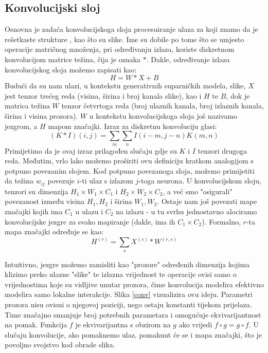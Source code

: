 \subsection{Konvolucijski sloj} 
Osnovna je zadaća konvolucijskoga sloja procesuiranje ulaza za koji znamo da je rešetkaste strukture \citep{Goodfellow-et-al-2016}, kao što su slike. Ime su dobile po tome što se umjesto operacije matričnog množenja, pri određivanju izlaza, koriste diskretnom konvolucijom matrice težina, čija je oznaka $*$. Dakle, određivanje izlaza konvolucijskog sloja možemo zapisati kao:
\begin{equation}
H = W * X + B
\end{equation}
Budući da su nam ulazi, u kontekstu generativnih suparničkih modela, slike, $X$ jest tenzor trećeg reda (visina, širina i broj kanala slike), kao i $H$ te $B$, dok je matrica težina $W$ tenzor četvrtoga reda (broj ulaznih kanala, broj izlaznih kanala, širina i visina prozora). $W$ u kontekstu konvolucijskoga sloja još nazivamo jezgrom, a $H$ mapom značajki. 
Izraz za diskretnu konvoluciju glasi:
\begin{equation}
(K * I)(i, j) = \sum_m\sum_nI(i - m, j - n)K(m, n)
\end{equation}
Primijetimo da je ovaj izraz prilagođen slučaju gdje su $K$ i $I$ tenzori drugoga reda. Međutim, vrlo lako možemo proširiti ovu definiciju kratkom analogijom s potpuno povezanim slojem. Kod potpuno povezanoga sloja, možemo primijetiti da težina $w_{ij}$ povezuje $i$-ti ulaz s izlazom $j$-toga neurona. U konvolucijskom sloju, tenzori su dimenzija $H_1 \times W_1 \times C_1$ i $H_2 \times W_2 \times C_2$, a već smo "osigurali" povezanost između visina $H_1, H_2$ i širina $W_1, W_2$. Ostaje nam još povezati mape značajki kojih ima $C_1$ u ulazu i $C_2$ na izlazu - u tu svrhu jednostavno alociramo konvolucijske jezgre za svako mapiranje (dakle, ima ih $C_1 \times C_2$). Formalno, $r$-ta mapa značajki određuje se kao:
\begin{equation}
H^{(r)} = \sum_s X^{(s)} * W^{(r, s)}
\end{equation}

Intuitivno, jezgre možemo zamisliti kao "prozore" određenih dimenzija kojima klizimo preko ulazne "slike" te izlazna vrijednost te operacije ovisi samo o vrijednostima koje su vidljive unutar prozora, čime konvolucija modelira efektivno modelira samo lokalne interakcije. Slika \ref{conv} vizualizira ovu ideju. Parametri prozora nisu ovisni o njegovoj poziciji, nego ostaju konstanti tijekom prijelaza. Time značajno smanjuje broj potrebnih parametara i omogućuje ekvivarijantnost na pomak. Funkcija $f$ je ekvivarijantna s obzirom na $g$ ako vrijedi $f \circ g = g \circ f$. U slučaju konvolucije, ako pomaknemo ulaz, pomaknut će se i mapa značajki, što je povoljno svojstvo kod obrade slika.

